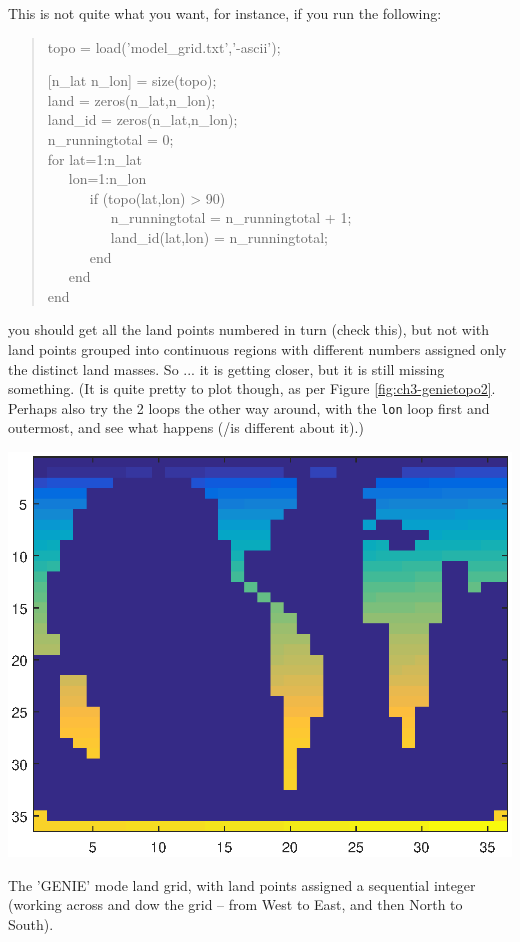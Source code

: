 \documentclass{tufte-book} %
\newenvironment{docspec}{\begin{quotation}\ttfamily\parskip0pt\parindent0pt\ignorespaces}{\end{quotation}}
\begin{document}
This is not quite what you want, for instance, if you run the following:
\begin{docspec}
topo = load('model\_grid.txt','-ascii');

[n\_lat n\_lon] = size(topo);
\\land = zeros(n\_lat,n\_lon);
\\land\_id = zeros(n\_lat,n\_lon);
\\n\_runningtotal = 0;
\\ for lat=1:n\_lat
\\ \ \ \ lon=1:n\_lon
\\ \ \ \ \ \ \ if (topo(lat,lon) > 90)
\\ \ \ \ \ \ \ \ \ \ n\_runningtotal = n\_runningtotal + 1;
\\ \ \ \ \ \ \ \ \ \ land\_id(lat,lon) = n\_runningtotal;
\\ \ \ \ \ \ \ end
\\ \ \ \ end
\\end
\end{docspec}
you should get all the land points numbered in turn (check this), but not with land points grouped into continuous regions with different numbers assigned only the distinct land masses. So ... it is getting closer, but it is still missing something.  (It is quite pretty to plot though, as per Figure \ref{fig:ch3-genietopo2}. Perhaps also try the 2 loops the other way around, with the \texttt{lon} loop first and outermost, and see what happens (/is different about it).)

\begin{marginfigure}[-0.0in]
\includegraphics[width=\linewidth]{ch3-genietopo2.eps}
\caption{The 'GENIE' mode land grid, with  land points assigned a sequential integer (working across and dow the grid --  from West to East, and then North to South).}
\label{fig:ch3-genietopo2}
\end{marginfigure}
\end{document}

